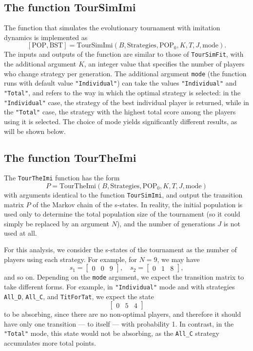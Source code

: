 \subsection{The function TourSimImi}
The function that simulates the evolutionary tournament with imitation dynamics is implemented as
\[
[\text{POP}, \text{BST}] = \text{TourSimImi}(B, \text{Strategies}, \text{POP}_0, K, T, J, \text{mode}).
\]
The inputs and outputs of the function are similar to those of \texttt{TourSimFit}, with the additional argument \( K \), an integer value that specifies the number of players who change strategy per generation. The additional argument \texttt{mode} (the function runs with default value \texttt{"Individual"}) can take the values \texttt{"Individual"} and \texttt{"Total"}, and refers to the way in which the optimal strategy is selected: in the \texttt{"Individual"} case, the strategy of the best individual player is returned, while in the \texttt{"Total"} case, the strategy with the highest total score among the players using it is selected. The choice of mode yields significantly different results, as will be shown below.

\subsection{The function TourTheImi}
The \texttt{TourTheImi} function has the form
\[
P = \text{TourTheImi}(B, \text{Strategies}, \text{POP}_0, K, T, J, \text{mode})
\]
with arguments identical to the function \texttt{TourSimImi}, and output the transition matrix \( P \) of the Markov chain of the s-states. In reality, the initial population is used only to determine the total population size of the tournament (so it could simply be replaced by an argument \( N \)), and the number of generations \( J \) is not used at all.

For this analysis, we consider the s-states of the tournament as the number of players using each strategy. For example, for \( N = 9 \), we may have
\[
s_1 = \begin{bmatrix} 0 & 0 & 9 \end{bmatrix}, \quad s_2 = \begin{bmatrix} 0 & 1 & 8 \end{bmatrix},
\]
and so on. Depending on the \texttt{mode} argument, we expect the transition matrix to take different forms. For example, in \texttt{"Individual"} mode and with strategies \texttt{All\_D}, \texttt{All\_C}, and \texttt{TitForTat}, we expect the state
\[
\begin{bmatrix} 0 & 5 & 4 \end{bmatrix}
\]
to be absorbing, since there are no non-optimal players, and therefore it should have only one transition — to itself — with probability 1. In contrast, in the \texttt{"Total"} mode, this state would not be absorbing, as the \texttt{All\_C} strategy accumulates more total points.

